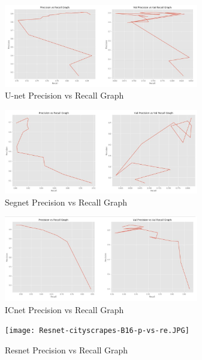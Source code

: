 \documentclass{IEEEtran}
\begin{document}
\begin{figure}[h]
    \centering
    \captionsetup{justification=centering}
    \includegraphics[width=8.5cm]{U-net-cityscrapes-B16-p-vs-re.JPG}
    \caption{U-net Precision vs Recall Graph}
    \label{fig:Binary class segmented output}
\end{figure}

\begin{figure}[h]
    \centering
    \captionsetup{justification=centering}
    \includegraphics[width=8.5cm]{Segnet-cityscrapes-B16-p-vs-re.JPG}
    \caption{Segnet Precision vs Recall Graph}
    \label{fig:Binary class segmented output}
\end{figure}

\begin{figure}[h]
    \centering
    \captionsetup{justification=centering}
    \includegraphics[width=8.5cm]{ICnet-cityscrapes-B16-p-vs-re.JPG}
    \caption{ICnet Precision vs Recall Graph}
    \label{fig:Binary class segmented output}
\end{figure}

\begin{figure}[h]
    \centering
    \captionsetup{justification=centering}
    \texttt{[image: Resnet-cityscrapes-B16-p-vs-re.JPG]}
    \caption{Resnet Precision vs Recall Graph}
    \label{fig:Binary class segmented output}
\end{figure}
\end{document}
